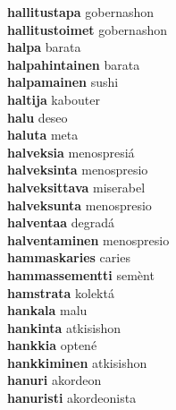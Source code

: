 \textbf{hallitustapa } gobernashon \\
\textbf{hallitustoimet } gobernashon \\
\textbf{halpa } barata \\
\textbf{halpahintainen } barata \\
\textbf{halpamainen } sushi \\
\textbf{haltija } kabouter \\
\textbf{halu } deseo \\
\textbf{haluta } meta \\
\textbf{halveksia } menospresiá \\
\textbf{halveksinta } menospresio \\
\textbf{halveksittava } miserabel \\
\textbf{halveksunta } menospresio \\
\textbf{halventaa } degradá \\
\textbf{halventaminen } menospresio \\
\textbf{hammaskaries } caries \\
\textbf{hammassementti } semènt \\
\textbf{hamstrata } kolektá \\
\textbf{hankala } malu \\
\textbf{hankinta } atkisishon \\
\textbf{hankkia } optené \\
\textbf{hankkiminen } atkisishon \\
\textbf{hanuri } akordeon \\
\textbf{hanuristi } akordeonista \\
